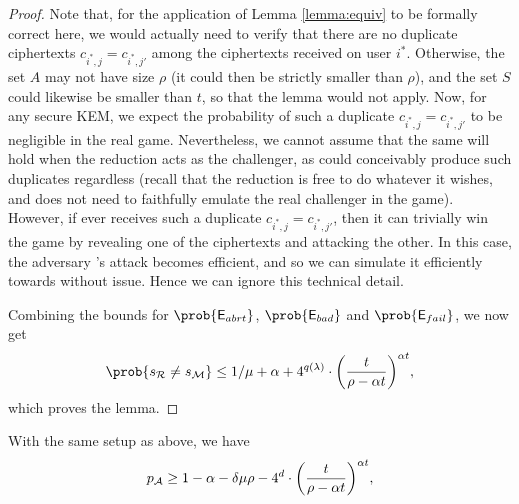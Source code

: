 \begin{proof}
  Note that, for the application of Lemma \ref{lemma:equiv} to be formally correct here,
  we would actually need to verify that there are no duplicate ciphertexts
  \(c_{i^{*},j} = c_{i^{*},j'}\) among the ciphertexts received on user \(i^{*}\).
  Otherwise, the set \(A\) may not have size \(\rho\)
  (it could then be strictly smaller than \(\rho\)),
  and the set \(S\) could likewise be smaller than \(t\),
  so that the lemma would not apply.
  Now, for any secure KEM, we expect the probability of such a
  duplicate \(c_{i^{*},j} = c_{i^{*},j'}\) to be negligible in the real \OWECPA game.
  Nevertheless, we cannot assume that the same will hold
  when the reduction \redR acts as the challenger,
  as \redR could conceivably produce such duplicates regardless
  (recall that the reduction is free to do whatever it wishes, and does not need to
  faithfully emulate the real challenger in the \OWECPA game).
  However, if \advA ever receives such a duplicate \(c_{i^{*},j} = c_{i^{*},j'}\),
  then it can trivially win the \OWECPA game by revealing one of the ciphertexts and attacking the other.
  In this case, the adversary \advA's attack becomes efficient,
  and so we can simulate it efficiently towards \redR without issue.
  Hence we can ignore this technical detail.

  Combining the bounds for \(\prob{\eventE_{abrt}}\), \(\prob{\eventE_{bad}}\) and \(\prob{\eventE_{fail}}\), we now get
  \[
    \prob{s_{\redR} \ne s_{\redM}} \le 1 / \mu + \alpha
    + 4^{q(\lambda)} \cdot \left( \frac{t}{\rho - \alpha t} \right)^{\alpha t},
  \]
  which proves the lemma.
\end{proof}

\begin{lemma}\label{lemma:A}
  With the same setup as above, we have
  \begin{equation}\label{ineq:A:lemma}
    p_{\advA} \ge 1 - \alpha - \delta \mu \rho
    - 4^{d} \cdot \left( \frac{t}{\rho - \alpha t} \right)^{\alpha t},
  \end{equation}
\end{lemma}

